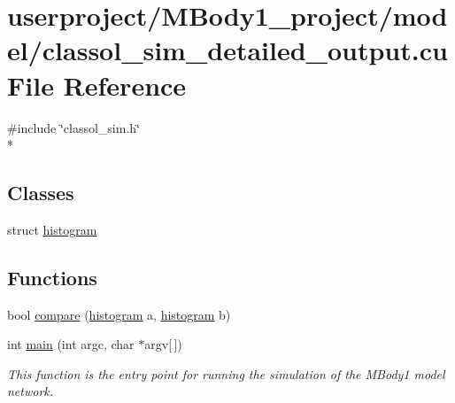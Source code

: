 \hypertarget{classol__sim__detailed__output_8cu}{\section{userproject/\+M\+Body1\+\_\+project/model/classol\+\_\+sim\+\_\+detailed\+\_\+output.cu File Reference}
\label{classol__sim__detailed__output_8cu}
}
{\ttfamily \#include \char`\"{}classol\+\_\+sim.\+h\char`\"{}}\\*
\subsection*{Classes}
\begin{DoxyCompactItemize}
\item 
struct \hyperlink{structhistogram}{histogram}
\end{DoxyCompactItemize}
\subsection*{Functions}
\begin{DoxyCompactItemize}
\item 
bool \hyperlink{classol__sim__detailed__output_8cu_a54fe57cc8072e7ca9c5d912b63e1caa1}{compare} (\hyperlink{structhistogram}{histogram} a, \hyperlink{structhistogram}{histogram} b)
\item 
int \hyperlink{classol__sim__detailed__output_8cu_a0ddf1224851353fc92bfbff6f499fa97}{main} (int argc, char $\ast$argv\mbox{[}$\,$\mbox{]})
\begin{DoxyCompactList}\small\item\em This function is the entry point for running the simulation of the M\+Body1 model network. \end{DoxyCompactList}\end{DoxyCompactItemize}


